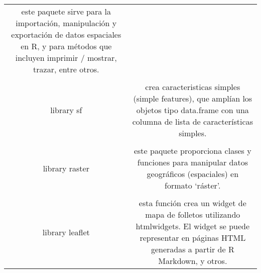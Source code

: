 \documentclass[11pt,]{article}
\begin{document}
\begin{longtable}[]{@{}cc@{}}
\begin{minipage}[t]{0.88\columnwidth}
este paquete sirve para la importación, manipulación y exportación de
datos espaciales en R, y para métodos que incluyen imprimir / mostrar,
trazar, entre otros.\strut
\end{minipage}\tabularnewline
\begin{minipage}[t]{0.07\columnwidth}\centering\strut
\strut
\end{minipage} & \begin{minipage}[t]{0.88\columnwidth}\centering\strut
\strut
\end{minipage}\tabularnewline
\begin{minipage}[t]{0.07\columnwidth}\centering\strut
library sf\strut
\end{minipage} & \begin{minipage}[t]{0.88\columnwidth}\centering\strut
crea caracteristicas simples (simple features), que amplían los objetos
tipo data.frame con una columna de lista de características
simples.\strut
\end{minipage}\tabularnewline
\begin{minipage}[t]{0.07\columnwidth}\centering\strut
\strut
\end{minipage} & \begin{minipage}[t]{0.88\columnwidth}\centering\strut
\strut
\end{minipage}\tabularnewline
\begin{minipage}[t]{0.07\columnwidth}\centering\strut
library raster\strut
\end{minipage} & \begin{minipage}[t]{0.88\columnwidth}\centering\strut
este paquete proporciona clases y funciones para manipular datos
geográficos (espaciales) en formato `ráster'.\strut
\end{minipage}\tabularnewline
\begin{minipage}[t]{0.07\columnwidth}\centering\strut
\strut
\end{minipage} & \begin{minipage}[t]{0.88\columnwidth}\centering\strut
\strut
\end{minipage}\tabularnewline
\begin{minipage}[t]{0.07\columnwidth}\centering\strut
library leaflet\strut
\end{minipage} & \begin{minipage}[t]{0.88\columnwidth}\centering\strut
esta función crea un widget de mapa de folletos utilizando htmlwidgets.
El widget se puede representar en páginas HTML generadas a partir de R
Markdown, y otros.\strut
\end{minipage}\tabularnewline

\end{longtable}
\end{document}
